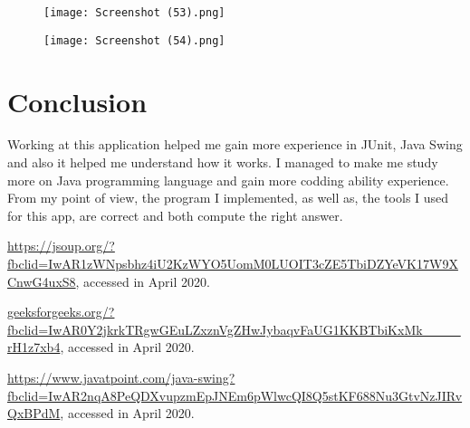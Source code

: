 \documentclass[11pt,leqno]{article}
\begin{document}
\begin{figure}[htp]
    \centering
    \texttt{[image: Screenshot (53).png]}
\end{figure}

\begin{figure}[htp]
    \centering
    \texttt{[image: Screenshot (54).png]}
\end{figure}

\newpage

\section{Conclusion}  
Working at this application helped me gain more experience in JUnit, Java Swing and also it helped me understand how it works. I managed to make me study more on Java programming language and gain more codding ability experience.\\
From my point of view, the program I implemented, as well as, the tools I used for this app, are correct and both compute the right answer.


\vspace{10 mm}


\begin{thebibliography}{9}

	\bibitem{}
	  \url{https://jsoup.org/?fbclid=IwAR1zWNpsbhz4iU2KzWYO5UomM0LUOIT3cZE5TbiDZYeVK17W9XCnwG4uxS8},
     accessed in April 2020.
     
     \bibitem{}
	  \url{geeksforgeeks.org/?fbclid=IwAR0Y2jkrkTRgwGEuLZxznVgZHwJybaqvFaUG1KKBTbiKxMk____rH1z7xb4},
     accessed in April 2020.

    \bibitem{}
     \url{https://www.javatpoint.com/java-swing?fbclid=IwAR2nqA8PeQDXvupzmEpJNEm6pWlwcQI8Q5stKF688Nu3GtvNzJIRvQxBPdM},
     accessed in April 2020.

\end{thebibliography}
\end{document}
